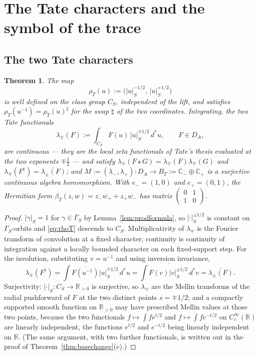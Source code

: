 \documentclass[11pt]{amsart}
\newtheorem{theorem}{Theorem}[section]
\theoremstyle{definition}
\theoremstyle{remark}
\newcommand{\C}{\mathbb C}
\newcommand{\R}{\mathbb R}
\newcommand{\dstar}{\,d^{*}}
\newcommand{\DA}{D_A}
\newcommand{\BT}{B_T}
\begin{document}
\section{The Tate characters and the symbol of the trace}\label{sec:symbol}

\subsection{The two Tate characters}

\begin{theorem}\label{thm:tate}
The map
\begin{equation}\label{eq:rhoT}
\rho_T(u):=\bigl(|u|_S^{-1/2},\,|u|_S^{+1/2}\bigr)
\end{equation}
is well defined on the class group $C_S$, independent of the lift, and
satisfies $\rho_T(u^{-1})=\rho_T(u)^{\sharp}$ for the swap $\sharp$ of the two
coordinates.  Integrating, the two \emph{Tate functionals}
\begin{equation}\label{eq:lambdadef}
\lambda_{\mp}(F):=\int_{C_S}F(u)\,|u|_S^{\mp1/2}\dstar u,\qquad F\in\DA,
\end{equation}
are continuous --- they are the local zeta functionals of Tate's thesis
\cite{Tate} evaluated at the two exponents $\mp\tfrac12$ --- and satisfy
$\lambda_{\mp}(F\star G)=\lambda_{\mp}(F)\lambda_{\mp}(G)$ and
$\lambda_{\mp}(F^{\dagger})=\overline{\lambda_{\pm}(F)}$; and
$M:=(\lambda_-,\lambda_+):\DA\to\BT:=\C_-\oplus\C_+$ is a surjective
continuous algebra homomorphism.  With $e_-=(1,0)$ and $e_+=(0,1)$, the
Hermitian form
$\beta_T(z,w)=z_-\overline{w_+}+z_+\overline{w_-}$ has matrix
$\left(\begin{smallmatrix}0&1\\1&0\end{smallmatrix}\right)$.
\end{theorem}

\begin{proof}
$|\gamma|_S=1$ for $\gamma\in\Gamma_S$ by Lemma~\ref{lem:prodformula}, so
$|\cdot|_S^{\pm1/2}$ is constant on $\Gamma_S$-orbits and \eqref{eq:rhoT}
descends to $C_S$.  Multiplicativity of $\lambda_{\mp}$ is the Fourier
transform of convolution at a fixed character; continuity is continuity of
integration against a locally bounded character on each fixed-support step.
For the involution, substituting $v=u^{-1}$ and using inversion invariance,
\[
\lambda_{\mp}(F^{\dagger})=\int\overline{F(u^{-1})}|u|_S^{\mp1/2}\dstar u
=\overline{\int F(v)|v|_S^{\pm1/2}\dstar v}=\overline{\lambda_{\pm}(F)}.
\]
Surjectivity: $|\cdot|_S:C_S\to\R_{>0}$ is surjective, so $\lambda_{\mp}$ are
the Mellin transforms of the radial pushforward of $F$ at the two distinct
points $s=\mp1/2$; and a compactly supported smooth function on $\R_{>0}$ may
have prescribed Mellin values at those two points, because the two functionals
$f\mapsto\int fe^{t/2}$ and $f\mapsto\int fe^{-t/2}$ on $C_c^{\infty}(\R)$ are
linearly independent, the functions $e^{t/2}$ and $e^{-t/2}$ being linearly
independent on $\R$.  (The same argument, with two further functionals, is
written out in the proof of Theorem~\ref{thm:basechange}(c).)
\end{proof}
\end{document}
